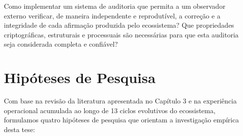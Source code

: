 \documentclass[12pt,a4paper,sumario=tradicional,openany]{abntex2}
\begin{document}
\begin{description}[style=nextline,leftmargin=2cm,font=\normalfont]
    \item[QP5 -- Auditabilidade:] Como implementar um sistema de auditoria que permita a um observador externo verificar, de maneira independente e reprodutível, a correção e a integridade de cada afirmação produzida pelo ecossistema? Que propriedades criptográficas, estruturais e processuais são necessárias para que esta auditoria seja considerada completa e confiável?
\end{description}

\section{Hipóteses de Pesquisa}

Com base na revisão da literatura apresentada no Capítulo 3 e na experiência operacional acumulada ao longo de 13 ciclos evolutivos do ecossistema, formulamos quatro hipóteses de pesquisa que orientam a investigação empírica desta tese:
\end{document}
